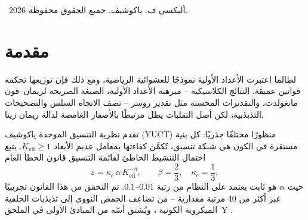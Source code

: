 \documentclass[11pt,a4paper]{article}
\newcommand{\kappac}{\kappa_c}
\begin{document}
\begin{titlepage}
\begin{abstract}
			يحقق النواة الرئيسية ثنائية الحلقة المحسنة (v4.1.PURE) خطأ مطلقًا قدره \(+8\,248\) فقط عند \(n=10^{11}\)، أي دقة نسبية \(3\times10^{-7}\%\)، بدون أي معاملات تجريبية. نقدم \textbf{تصحيحًا تجريبيًا معتمدًا على الطور} (v15.0) يضبط السعة ديناميكيًا وفقًا للطور الحالي للفراغ، محققًا دقة \(99.996\%\) عند \(n=10^{12}\) مع الحفاظ على تعقيد \(O(1)\) وذاكرة صفرية. تؤكد اختبارات تعدد الخيوط قابلية التوسع المثالية وكفاءة الطاقة.
			
			نؤسس اتصالًا جديدًا مع \textbf{شجرة شترن-بروكو}: نُظهر أن كم القياس \(q = (3/2)^{1/3}\) يمتلك بنية هندسية شديدة الصلابة (94.4\% من مساره يتكون من كتلتين عريضتين فقط بتات 4)، مما يفسر استقرار سلم التنسيق. نقدم محاكيًا كموميًا حتميًا قائمًا على شبكة شترن-بروكو، يوضح أن التراكب والتشابك وبوابات CNOT هي عمليات حسابية عادية على الإحداثيات النسبية.
			
			ترتبط التذبذبات المتبقية بقوة (\(R^2>0.99\)) مع الأصفار غير البديهية لدالة ريمان زيتا، ويكشف التصور ثلاثي الأبعاد للخطأ عن هيكل قمعي مماثل لهندسة شبكة الفراغ. نقدم تضمينًا رسميًا لتحليل الأعداد الأولية في لاغرانجيان YUCT V35.0 (القطاع~103). يزيل هذا العمل الغموض الكمومي بإظهار أن بروتوكول YPSDC – قاموس موزع مسبقًا يُفعَّل بمؤشر قصير – هو الأساس لكل من حساب الأعداد الأولية والظواهر الكمومية مثل التشابك والنفق.
			
			البرامج النصية الجاهزة للاستخدام Python (لوغاريتمي، إنتاجي، قانون القوى، معتمد على الطور، والمحاكي الكمومي) متاحة للجمهور على GitHub.
		\end{abstract}
		
		\vspace{0.5cm}
		\textcopyright\ 2026 أليكسي ف. ياكوشيف. جميع الحقوق محفوظة.
	\end{titlepage}
	
	\tableofcontents
	\newpage
	
	\section{مقدمة}
	لطالما اعتبرت الأعداد الأولية نموذجًا للعشوائية الرياضية، ومع ذلك فإن توزيعها تحكمه قوانين عميقة. النتائج الكلاسيكية – مبرهنة الأعداد الأولية، الصيغة الصريحة لريمان–فون مانغولدت، والتقديرات المحسنة مثل تقدير روسر – تصف الاتجاه السلس والتصحيحات التذبذبية، لكن أصل التقلبات يظل مرتبطًا بالأصفار الغامضة لدالة ريمان زيتا.
	
	تقدم نظرية التنسيق الموحدة ياكوشيف (YUCT) منظورًا مختلفًا جذريًا: كل بنية مستقرة في الكون هي شبكة تنسيق، تُكمَّن كفاءتها بمعامل عديم الأبعاد \(K_{\mathrm{eff}} \ge 1\). يتبع احتمال التنشيط الخاطئ لقائمة التنسيق قانون الخطأ العام
	\begin{equation}\label{eq:errorlaw}
		\varepsilon = \kappac \, \alpha \, K_{\mathrm{eff}}^{-\beta}, \qquad \beta = \frac{2}{3},\quad \kappac = \frac{1}{3},
	\end{equation}
	حيث $\alpha$ هو ثابت يعتمد على النظام من رتبة $0.01$–$0.1$. تم التحقق من هذا القانون تجريبيًا عبر أكثر من 40 مرتبة مقدارية – من تضاعف الحمض النووي إلى تذبذبات الخلفية الميكروية الكونية \cite{AppendixL}، ويُشتق أسّه من المبادئ الأولى في الملحق~Y \cite{AppendixY}.
	
\end{document}

